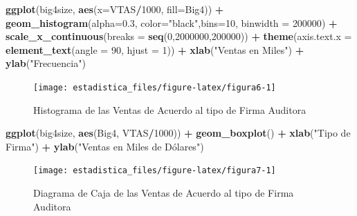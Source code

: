 \documentclass[]{book}
\newenvironment{Shaded}{\begin{snugshade}}{\end{snugshade}}
\newcommand{\DataTypeTok}[1]{\textcolor[rgb]{0.13,0.29,0.53}{#1}}
\newcommand{\DecValTok}[1]{\textcolor[rgb]{0.00,0.00,0.81}{#1}}
\newcommand{\FloatTok}[1]{\textcolor[rgb]{0.00,0.00,0.81}{#1}}
\newcommand{\KeywordTok}[1]{\textcolor[rgb]{0.13,0.29,0.53}{\textbf{#1}}}
\newcommand{\NormalTok}[1]{#1}
\newcommand{\OperatorTok}[1]{\textcolor[rgb]{0.81,0.36,0.00}{\textbf{#1}}}
\newcommand{\StringTok}[1]{\textcolor[rgb]{0.31,0.60,0.02}{#1}}
\begin{document}
\begin{Shaded}
\begin{Highlighting}[]
\KeywordTok{ggplot}\NormalTok{(big4size, }\KeywordTok{aes}\NormalTok{(}\DataTypeTok{x=}\NormalTok{VTAS}\OperatorTok{/}\DecValTok{1000}\NormalTok{, }\DataTypeTok{fill=}\NormalTok{Big4)) }\OperatorTok{+}\StringTok{ }
\StringTok{  }\KeywordTok{geom_histogram}\NormalTok{(}\DataTypeTok{alpha=}\FloatTok{0.3}\NormalTok{, }\DataTypeTok{color=}\StringTok{"black"}\NormalTok{,}\DataTypeTok{bins=}\DecValTok{10}\NormalTok{, }\DataTypeTok{binwidth =} \DecValTok{200000}\NormalTok{) }\OperatorTok{+}
\StringTok{  }\KeywordTok{scale_x_continuous}\NormalTok{(}\DataTypeTok{breaks =} \KeywordTok{seq}\NormalTok{(}\DecValTok{0}\NormalTok{,}\DecValTok{2000000}\NormalTok{,}\DecValTok{200000}\NormalTok{)) }\OperatorTok{+}
\StringTok{  }\KeywordTok{theme}\NormalTok{(}\DataTypeTok{axis.text.x =} \KeywordTok{element_text}\NormalTok{(}\DataTypeTok{angle =} \DecValTok{90}\NormalTok{, }\DataTypeTok{hjust =} \DecValTok{1}\NormalTok{)) }\OperatorTok{+}
\StringTok{  }\KeywordTok{xlab}\NormalTok{(}\StringTok{"Ventas en Miles"}\NormalTok{) }\OperatorTok{+}\StringTok{ }\KeywordTok{ylab}\NormalTok{(}\StringTok{"Frecuencia"}\NormalTok{) }
\end{Highlighting}
\end{Shaded}

\begin{figure}[h!]

{\centering \texttt{[image: estadistica\_files/figure-latex/figura6-1]} 

}

\caption{Histograma de las Ventas de Acuerdo al tipo de Firma Auditora}\label{fig:figura6}
\end{figure}

\begin{Shaded}
\begin{Highlighting}[]
\KeywordTok{ggplot}\NormalTok{(big4size, }\KeywordTok{aes}\NormalTok{(Big4, VTAS}\OperatorTok{/}\DecValTok{1000}\NormalTok{)) }\OperatorTok{+}\StringTok{ }
\StringTok{  }\KeywordTok{geom_boxplot}\NormalTok{() }\OperatorTok{+}\StringTok{ }\KeywordTok{xlab}\NormalTok{(}\StringTok{"Tipo de Firma"}\NormalTok{) }\OperatorTok{+}
\StringTok{  }\KeywordTok{ylab}\NormalTok{(}\StringTok{"Ventas en Miles de Dólares")}
\end{Highlighting}
\end{Shaded}

\begin{figure}[h!]

{\centering \texttt{[image: estadistica\_files/figure-latex/figura7-1]} 

}

\caption{Diagrama de Caja de las Ventas de Acuerdo al tipo de Firma Auditora}\label{fig:figura7}
\end{figure}
\end{document}

